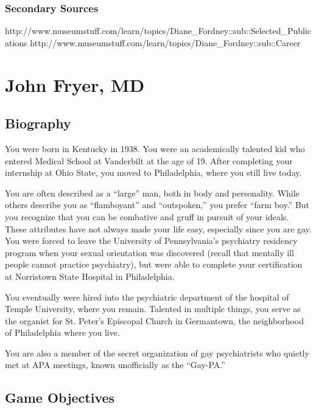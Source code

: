 \begin{refsection}
\subsection{Secondary Sources}
\label{secondarysources}

http:\slash \slash www.museumstuff.com\slash learn\slash topics\slash Diane\_Fordney::sub::Selected\_Publications
http:\slash \slash www.museumstuff.com\slash learn\slash topics\slash Diane\_Fordney::sub::Career

\chapter{John Fryer, MD}
\label{johnfryermd}

\section{Biography}
\label{biography}

You were born in Kentucky in 1938. You were an academically talented kid who entered Medical School at Vanderbilt at the age of 19. After completing your internship at Ohio State, you moved to Philadelphia, where you still live today.

You are often described as a “large” man, both in body and personality. While others describe you as “flamboyant” and “outspoken,” you prefer “farm boy.” But you recognize that you can be combative and gruff in pursuit of your ideals. These attributes have not always made your life easy, especially since you are gay. You were forced to leave the University of Pennsylvania's psychiatry residency program when your sexual orientation was discovered (recall that mentally ill people cannot practice psychiatry), but were able to complete your certification at Norristown State Hospital in Philadelphia.

You eventually were hired into the psychiatric department of the hospital of Temple University, where you remain. Talented in multiple things, you serve as the organist for St. Peter's Episcopal Church in Germantown, the neighborhood of Philadelphia where you live.

You are also a member of the secret organization of gay psychiatrists who quietly met at APA meetings, known unofficially as the “Gay-PA.”

\section{Game Objectives}
\label{gameobjectives}


\end{refsection}
